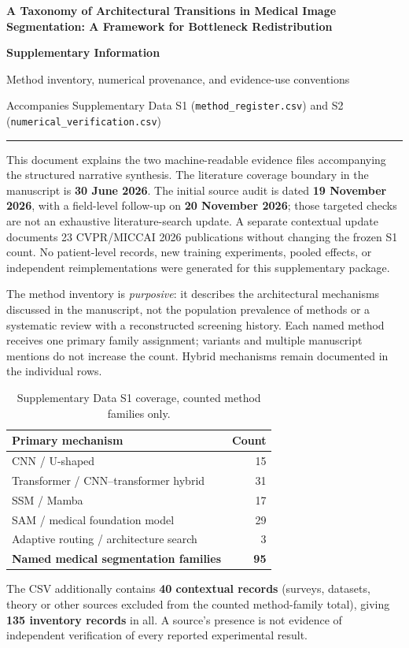 \documentclass[11pt,a4paper]{article}
\newcommand{\ssection}[1]{\vspace{5pt}\noindent{\large\bfseries\color{navy}#1}\par\vspace{3pt}}
\begin{document}
\begin{center}
{\large\bfseries A Taxonomy of Architectural Transitions in Medical Image Segmentation: A Framework for Bottleneck Redistribution}\par
\vspace{8pt}
{\LARGE\bfseries Supplementary Information}\par
\vspace{3pt}
{\large Method inventory, numerical provenance, and evidence-use conventions}\par
\vspace{8pt}
{\small Accompanies Supplementary Data S1 (\nolinkurl{method_register.csv}) and S2 (\nolinkurl{numerical_verification.csv})}\par
\end{center}
\vspace{4pt}\hrule\vspace{9pt}

\ssection{S1. Scope and provenance}
This document explains the two machine-readable evidence files accompanying the structured narrative synthesis. The literature coverage boundary in the manuscript is \textbf{30 June 2026}. The initial source audit is dated \textbf{19 November 2026}, with a field-level follow-up on \textbf{20 November 2026}; those targeted checks are not an exhaustive literature-search update. A separate contextual update documents 23 CVPR/MICCAI 2026 publications without changing the frozen S1 count. No patient-level records, new training experiments, pooled effects, or independent reimplementations were generated for this supplementary package.

The method inventory is \emph{purposive}: it describes the architectural mechanisms discussed in the manuscript, not the population prevalence of methods or a systematic review with a reconstructed screening history. Each named method receives one primary family assignment; variants and multiple manuscript mentions do not increase the count. Hybrid mechanisms remain documented in the individual rows.

\begin{table}[H]
\centering\small
\caption{Supplementary Data S1 coverage, counted method families only.}
\begin{tabularx}{0.95\linewidth}{Xr}\toprule
\textbf{Primary mechanism} & \textbf{Count}\\\midrule
CNN / U-shaped & 15\\
Transformer / CNN--transformer hybrid & 31\\
SSM / Mamba & 17\\
SAM / medical foundation model & 29\\
Adaptive routing / architecture search & 3\\\midrule
\textbf{Named medical segmentation families} & \textbf{95}\\\bottomrule
\end{tabularx}
\end{table}
The CSV additionally contains \textbf{40 contextual records} (surveys, datasets, theory or other sources excluded from the counted method-family total), giving \textbf{135 inventory records} in all. A source's presence is not evidence of independent verification of every reported experimental result.
\end{document}
